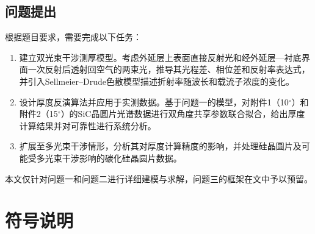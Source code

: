 \documentclass[12pt,a4paper]{ctexart}
\begin{document}
	\subsection{问题提出}
	根据题目要求，需要完成以下任务：
	
	\begin{enumerate}[leftmargin=2em]
		\item 建立双光束干涉测厚模型。考虑外延层上表面直接反射光和经外延层—衬底界面一次反射后透射回空气的两束光，推导其光程差、相位差和反射率表达式，并引入Sellmeier–Drude色散模型描述折射率随波长和载流子浓度的变化。
		\item 设计厚度反演算法并应用于实测数据。基于问题一的模型，对附件1（10$^\circ$）和附件2（15$^\circ$）的SiC晶圆片光谱数据进行双角度共享参数联合拟合，给出厚度计算结果并对可靠性进行系统分析。
		\item 扩展至多光束干涉情形，分析其对厚度计算精度的影响，并处理硅晶圆片及可能受多光束干涉影响的碳化硅晶圆片数据。
	\end{enumerate}
	
	本文仅针对问题一和问题二进行详细建模与求解，问题三的框架在文中予以预留。
	
	\section{符号说明}
	
\end{document}
